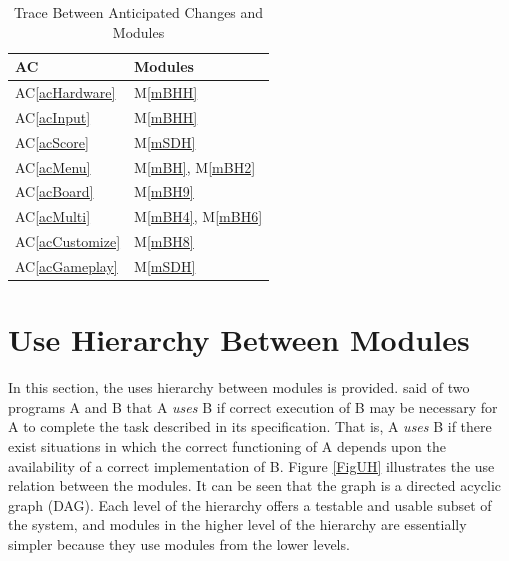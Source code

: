\documentclass[12pt, titlepage]{article}
\newcommand{\acref}[1]{AC\ref{#1}}
\newcommand{\mref}[1]{M\ref{#1}}
\begin{document}
\begin{table}[H]
\centering
\begin{tabular}{p{} p{}}
\toprule
\textbf{AC} & \textbf{Modules}\\
\midrule
\acref{acHardware} & \mref{mBHH}\\
\acref{acInput} & \mref{mBHH}\\
\acref{acScore} & \mref{mSDH}\\
\acref{acMenu} & \mref{mBH}, \mref{mBH2}\\
\acref{acBoard} & \mref{mBH9}\\
\acref{acMulti} & \mref{mBH4}, \mref{mBH6}\\
\acref{acCustomize} & \mref{mBH8}\\
\acref{acGameplay} & \mref{mSDH}\\

\bottomrule
\end{tabular}
\caption{Trace Between Anticipated Changes and Modules}
\label{TblACT}
\end{table}

\section{Use Hierarchy Between Modules} \label{SecUse}

In this section, the uses hierarchy between modules is
provided. \citet{Parnas1978} said of two programs A and B that A {\em uses} B if
correct execution of B may be necessary for A to complete the task described in
its specification. That is, A {\em uses} B if there exist situations in which
the correct functioning of A depends upon the availability of a correct
implementation of B.  Figure \ref{FigUH} illustrates the use relation between
the modules. It can be seen that the graph is a directed acyclic graph
(DAG). Each level of the hierarchy offers a testable and usable subset of the
system, and modules in the higher level of the hierarchy are essentially simpler
because they use modules from the lower levels.
\end{document}
